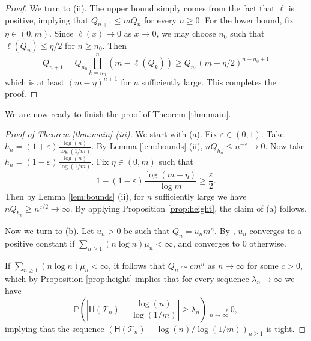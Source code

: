 \documentclass[a4paper,11pt]{article}
\DeclareRobustCommand{\P}{\mathbb{P}}
\DeclareRobustCommand{\to}{\xrightarrow[n\rightarrow \infty]{}}
\begin{document}
\begin{proof}
            We turn to (ii). The upper bound simply comes from the fact that $\ell$ is positive, implying that  $Q_{n+1}  \leq  mQ_n$ for every $n \geq 0$. For the lower bound, fix $\eta \in (0,m)$. Since $\ell(x) \rightarrow 0$ as $ x \rightarrow 0$, we may choose $n_{0}$ such that $\ell(Q_{n}) \leq \eta/2$ for $n \geq n_{0}$. Then
$$
Q_{n+1} = Q_{n_0} \prod_{k=n_0}^n (m-\ell(Q_k)) \geq Q_{n_{0}} \left( m-\eta/2 \right)^{n-n_{0}+1}$$
which is at least $(m-\eta)^{n+1}$ for $n$ sufficiently large. This completes the proof.
            \end{proof}


We are now ready to finish the proof of Theorem \ref{thm:main}.

\begin{proof}[Proof of Theorem \ref{thm:main} (iii)]
We start with (a). Fix $\varepsilon \in (0,1)$. Take $h_{n}=(1+\varepsilon) \frac{\log(n)}{\log(1/m)}$. By Lemma \ref{lem:bounds} (ii), $n Q_{ h_{n}} \leq  {n^{-\varepsilon}}  \rightarrow 0$.
Now take $h_{n}=(1-\varepsilon) \frac{\log(n)}{\log(1/m)}$.  Fix  $\eta \in (0,m)$ such that
$$1-(1-\varepsilon) \frac{\log(m-\eta)}{\log m} \geq  \frac{\varepsilon}{2}.$$
Then by   Lemma \ref{lem:bounds} (ii), for $n$ sufficiently large we have $n Q_{ h_{n}} \geq n^{\varepsilon/2} \rightarrow \infty$. By applying Proposition \ref{prop:height}, the claim of (a) follows.

Now we turn to (b). Let $u_{n}>0$ be such that $Q_{n}= u_{n} m^{n }$.  By  \cite[Theorem 2]{HSV67}, $u_{n}$ converges to a positive constant  if $\sum_{n \geq 1} (n \log n) \mu_{n} <\infty$, and converges to $0$ otherwise.

If $\sum_{n \geq 1} (n \log n) \mu_{n} <\infty$, it follows that  $Q_{n} \sim c m^{n }$ as $n \rightarrow \infty$ for some $c>0$, which by Proposition \ref{prop:height} implies that for every sequence $\lambda_{n} \rightarrow \infty$ we have
$$ \P\left( \left|{\mathsf{H}(\mathcal{T}_n)}- \frac{\log(n)}{\log(1/m)} \right| \geq \lambda_{n}\right) \to 0,$$
implying that  the sequence $ \left({\mathsf{H}(\mathcal{T}_n)}- {\log(n)}/{\log(1/m)} \right)_{n \geq 1}$ is tight.


\end{proof}
\end{document}
